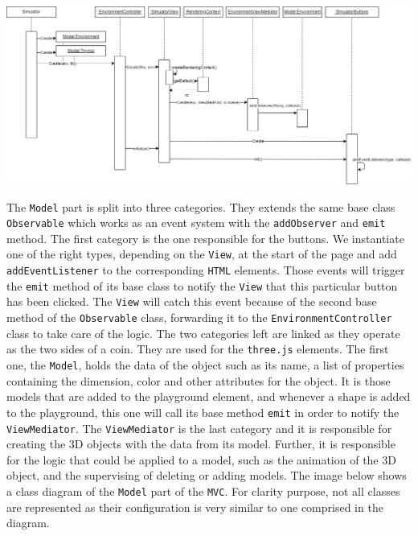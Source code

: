 \documentclass{scrreprt}
\begin{document}
\begin{center}
  \includegraphics[width=\textwidth]{./start_app}
\end{center}

The \texttt{Model} part is split into three categories. They extends the same base class \texttt{Observable} which works as an event system with the \texttt{addObserver} and \texttt{emit} method. 
The first category is the one responsible for the buttons. We instantiate one of the right types, depending on the \texttt{View}, at the start of the page and add \texttt{addEventListener} to the corresponding \texttt{HTML} elements. 
Those events will trigger the \texttt{emit} method of its base class to notify the \texttt{View} that this particular button has been clicked. The \texttt{View} will catch this event because of the second base method of the \texttt{Observable} class, 
forwarding it to the \texttt{EnvironmentController} class to take care of the logic. 
The two categories left are linked as they operate as the two sides of a coin. They are used for the \texttt{three.js} elements. The first one, the \texttt{Model}, holds the data of the object such as its name, a list of properties containing the dimension, 
color and other attributes for the object. It is those models that are added to the playground element, and whenever a shape is added to the playground, this one will call its base method \texttt{emit} in order to notify the \texttt{ViewMediator}. 
The \texttt{ViewMediator} is the last category and it is responsible for creating the 3D objects with the data from its model. Further, it is responsible for the logic that could be applied to a model, such as the animation of the 3D object, and the supervising of deleting or adding models.     
The image below shows a class diagram of the \texttt{Model} part of the \texttt{MVC}. For clarity purpose, not all classes are represented as their configuration is very similar to one comprised in the diagram.
\end{document}
